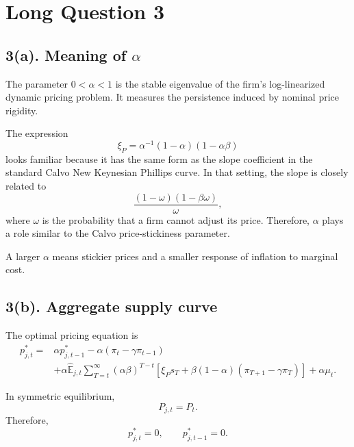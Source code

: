 \documentclass[12pt]{article}
\begin{document}





\newpage
\section*{Long Question 3}

\subsection*{3(a). Meaning of $\alpha$}

The parameter $0<\alpha<1$ is the stable eigenvalue of the firm's log-linearized dynamic pricing problem. It measures the persistence induced by nominal price rigidity.

The expression
\[
\xi_P=\alpha^{-1}(1-\alpha)(1-\alpha\beta)
\]
looks familiar because it has the same form as the slope coefficient in the standard Calvo New Keynesian Phillips curve. In that setting, the slope is closely related to
\[
\frac{(1-\omega)(1-\beta\omega)}{\omega},
\]
where $\omega$ is the probability that a firm cannot adjust its price. Therefore, $\alpha$ plays a role similar to the Calvo price-stickiness parameter.

A larger $\alpha$ means stickier prices and a smaller response of inflation to marginal cost.

\subsection*{3(b). Aggregate supply curve}

The optimal pricing equation is
\[
\begin{aligned}
p^*_{j,t}
=
&\alpha p^*_{j,t-1}
-\alpha(\pi_t-\gamma\pi_{t-1})  \\
&+
\alpha\hat{\mathbb{E}}_{j,t}
\sum_{T=t}^{\infty}
(\alpha\beta)^{T-t}
\left[
\xi_P s_T
+
\beta(1-\alpha)(\pi_{T+1}-\gamma\pi_T)
\right]
+
\alpha\mu_t.
\end{aligned}
\]

In symmetric equilibrium,
\[
P_{j,t}=P_t.
\]
Therefore,
\[
p^*_{j,t}=0,
\qquad
p^*_{j,t-1}=0.
\]
\end{document}
